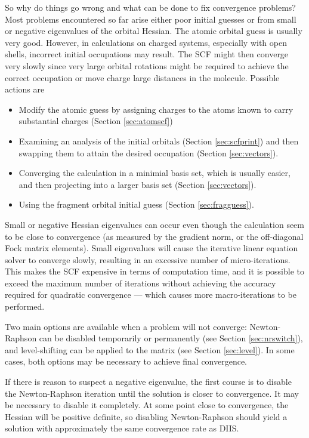 So why do things go wrong and what can be done to fix convergence
problems?  Most problems encountered so far arise either poor initial
guesses or from small or negative eigenvalues of the orbital Hessian.
The atomic orbital guess is usually very good.  However, in
calculations on charged systems, especially with open shells,
incorrect initial occupations may result.  The SCF might then converge
very slowly since very large orbital rotations might be required to
achieve the correct occupation or move charge large distances in the
molecule.  Possible actions are
\begin{itemize}
\item Modify the atomic guess by assigning charges to the atoms
  known to carry substantial charges (Section \ref{sec:atomscf})
\item Examining an analysis of the initial orbitals (Section
  \ref{sec:scfprint}) and then swapping them to attain the desired
  occupation (Section \ref{sec:vectors}).
\item Converging the calculation in a minimial basis set, which is
  usually easier, and then projecting into a larger basis set (Section
  \ref{sec:vectors}).
\item Using the fragment orbital initial guess (Section
  \ref{sec:fragguess}).
\end{itemize}

Small or negative Hessian eigenvalues can occur even though the
calculation seem to be close to convergence (as measured by the
gradient norm, or the off-diagonal Fock matrix elements).  Small
eigenvalues will cause the iterative linear equation solver to
converge slowly, resulting in an excessive number of micro-iterations.
This makes the SCF expensive in terms of computation time, and it is
possible to exceed the maximum number of iterations without achieving
the accuracy required for quadratic convergence --- which causes more
macro-iterations to be performed. 

Two main options are available when a problem will not converge:
Newton-Raphson can be disabled temporarily or permanently (see Section
\ref{sec:nrswitch}), and level-shifting can be applied to the matrix
(see Section \ref{sec:level}).  In some cases, both options may be
necessary to achieve final convergence.

If there is reason to suspect a negative eigenvalue, the first course
is to disable the Newton-Raphson iteration until the solution is
closer to convergence.  It may be necessary to disable it completely.
At some point close to convergence, the Hessian will be positive
definite, so disabling Newton-Raphson should yield a solution with
approximately the same convergence rate as DIIS.

